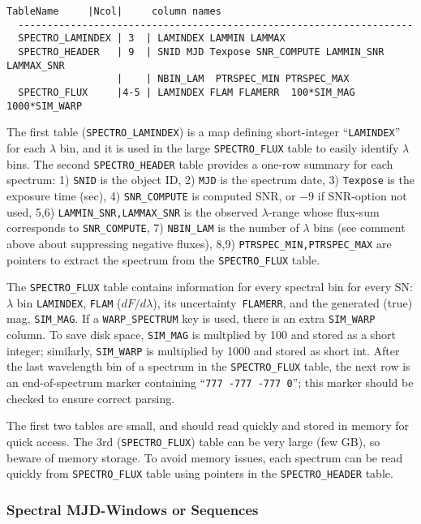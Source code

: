 \documentclass[12pt]{article}
\newcommand{\unc}{uncertainty}
\newcommand{\Flam}{dF/d\lambda}
\begin{document}
\begin{Verbatim}[frame=single]
     TableName     |Ncol|     column names 
  --------------------------------------------------------------------
  SPECTRO_LAMINDEX | 3  | LAMINDEX LAMMIN LAMMAX
  SPECTRO_HEADER   | 9  | SNID MJD Texpose SNR_COMPUTE LAMMIN_SNR LAMMAX_SNR
                   |    | NBIN_LAM  PTRSPEC_MIN PTRSPEC_MAX
  SPECTRO_FLUX     |4-5 | LAMINDEX FLAM FLAMERR  100*SIM_MAG  1000*SIM_WARP
\end{Verbatim}
%
The first table ({\tt SPECTRO\_LAMINDEX}) is a map defining
short-integer ``{\tt LAMINDEX}'' for each $\lambda$ bin,
and it is used in the large {\tt SPECTRO\_FLUX}
table to easily identify $\lambda$ bins.
The second {\tt SPECTRO\_HEADER} table provides a one-row summary for 
each spectrum:
1) {\tt SNID} is the object ID, 
2) {\tt MJD} is the spectrum date, 
3) {\tt Texpose}  is the exposure time (sec), 
4) {\tt SNR\_COMPUTE} is computed SNR, or $-9$ if SNR-option not used,
5,6) {\tt LAMMIN\_SNR,LAMMAX\_SNR} is the observed $\lambda$-range
  whose flux-sum corresponds to {\tt SNR\_COMPUTE},
7) {\tt NBIN\_LAM} is the number of $\lambda$ bins
(see comment above about suppressing negative fluxes), 
8,9) {\tt PTRSPEC\_MIN,PTRSPEC\_MAX} are  pointers to extract the 
spectrum from the {\tt SPECTRO\_FLUX} table.

The {\tt SPECTRO\_FLUX} table contains information for every spectral 
bin for every SN: 
$\lambda$ bin {\tt LAMINDEX},
{\tt FLAM} ($\Flam$), 
its \unc\ {\tt FLAMERR}, 
and the generated (true) mag, {\tt SIM\_MAG}.
If a {\tt WARP\_SPECTRUM} key is used, 
there is an extra {\tt SIM\_WARP} column.
To save disk space, {\tt SIM\_MAG} is multplied by 100 and stored as
a short integer; 
similarly, {\tt SIM\_WARP} is multiplied by 1000 and stored as short int.
After the last wavelength bin of a spectrum in the {\tt SPECTRO\_FLUX}
table,  the next row is an end-of-spectrum marker containing
``{\tt 777  -777  -777  0}''; 
this marker should be checked to ensure correct parsing.

The first two tables are small, and should read quickly and 
stored in memory for quick access. The 3rd ({\tt SPECTRO\_FLUX}) 
table can be very large (few GB), so beware of memory storage.
To avoid memory issues, each spectrum can be read quickly
from {\tt SPECTRO\_FLUX} table using pointers in the 
{\tt SPECTRO\_HEADER} table.

\subsubsection{Spectral MJD-Windows or Sequences }
\label{sss:SPEC_MJD}
\end{document}
